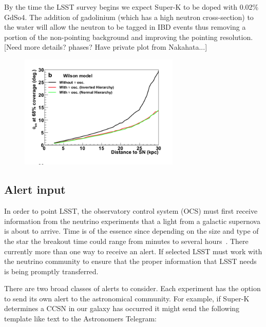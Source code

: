 \documentclass[11pt]{article}
\newcommand{\superk}  {Super\nobreakdash-K\xspace}
\begin{document}
By the time the LSST survey begins we expect \superk to be doped with
0.02\% GdSo4.  The addition of gadolinium (which has a high neutron
cross-section) to the water will allow the neutron to be tagged in IBD
events thus removing a portion of the non-pointing background and
improving the pointing resolution. [Need more details? phases? Have
private plot from Nakahata...]

\begin{figure}
  \begin{center}
    \includegraphics[width=3.0in]{SK-realtime-pointing-resolution}
    \caption{}
    \label{fig:SK-realtime-pointing-resolution}
  \end{center}
\end{figure}

\subsection{Alert input}


In order to point LSST, the observatory control system (OCS) must first
receive information from the neutrino experiments that a light from a
galactic supernova is about to arrive.  Time is of the essence since
depending on the size and type of the star the breakout time could
range from minutes to several hours~\cite{needcitation}.  There
currently more than one way to receive an alert. If selected LSST must
work with the neutrino community to ensure that the proper information
that LSST needs is being promptly transferred.

There are two broad classes of alerts to consider.  Each experiment
has the option to send its own alert to the astronomical community.
For example, if \superk determines a CCSN in our galaxy has occurred
it might send the following template like text to the Astronomers
Telegram:
\end{document}
